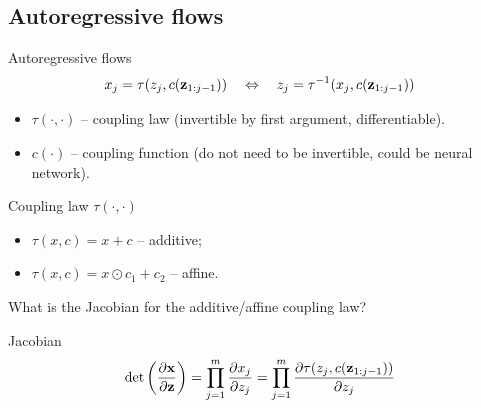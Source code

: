 \documentclass{beamer}
\begin{document}
\subsection{Autoregressive flows}
\begin{frame}{Autoregressive flows}
	\vspace{-0.3cm}
	\[
	x_j = \tau (z_j, c(\mathbf{z}_{1:j-1})) \quad \Leftrightarrow \quad z_j = \tau^{-1} (x_j, c(\mathbf{z}_{1:j-1}))
	\]
	\vspace{-0.3cm}
	\begin{itemize}
		\item $\tau (\cdot, \cdot)$ -- coupling law (invertible by first argument, differentiable).
		\item $c(\cdot)$ -- coupling function (do not need to be invertible, could be neural network).
	\end{itemize}
	\begin{block}{Coupling law $\tau(\cdot, \cdot)$}
		\begin{itemize}
			\item $\tau(x, c) = x + c$ -- additive;
			\item $\tau(x, c) = x \odot c_1 + c_2$ -- affine.
		\end{itemize}
	\end{block}
	What is the Jacobian for the additive/affine coupling law? 
	\begin{block}{Jacobian}
		\vspace{-0.3cm}
		\[
		\det \left( \frac{\partial \mathbf{x}}{\partial \mathbf{z}} \right) = \prod_{j=1}^m \frac{\partial x_j}{\partial z_j} = \prod_{j=1}^m \frac{\partial \tau (z_j, c(\mathbf{z}_{1:j-1})) }{\partial z_j}
		\]
		\vspace{-0.3cm}
	\end{block}
	
\end{frame}
\end{document}
